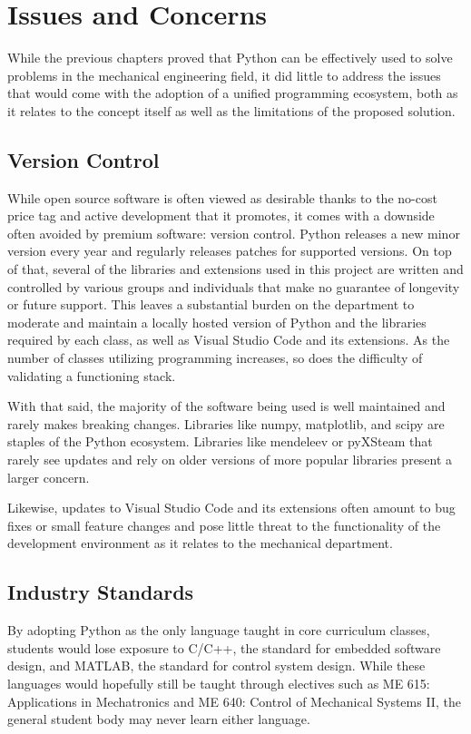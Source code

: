 \section{Issues and Concerns}

While the previous chapters proved that Python can be effectively
used to solve problems in the mechanical engineering field, it did 
little to address the issues that would come with the adoption 
of a unified programming ecosystem, both as it relates to the
concept itself as well as the limitations of the proposed solution.

\subsection{Version Control}

While open source software is often viewed as desirable
thanks to the no-cost price tag and active development that it 
promotes, it comes with a downside often avoided by premium
software: version control. Python releases a new minor version
every year and regularly releases patches for supported versions.
On top of that, several of the libraries and extensions 
used in this project are written and controlled by various 
groups and individuals that make no guarantee of longevity or future
support. This leaves a substantial burden on the department to
moderate and maintain a locally hosted version of Python and the
libraries required by each class, as well as Visual Studio Code and
its extensions. As the number of classes utilizing programming
increases, so does the difficulty of validating a functioning stack.

With that said, the majority of the software being used is well
maintained and rarely makes breaking changes. Libraries like numpy,
matplotlib, and scipy are staples of the Python ecosystem. Libraries
like mendeleev or pyXSteam that rarely see updates and rely on older
versions of more popular libraries present a larger concern.

Likewise, updates to Visual Studio Code and its extensions often
amount to bug fixes or small feature changes and pose little threat
to the functionality of the development environment as it relates to
the mechanical department.

\subsection{Industry Standards}

By adopting Python as the only language taught in core curriculum
classes, students would lose exposure to C/C++, the standard for 
embedded software design, and MATLAB, the standard for control system
design. While these languages would hopefully still be taught
through electives such as ME 615: Applications in Mechatronics 
and ME 640: Control of Mechanical Systems II, the general student body
may never learn either language. 

